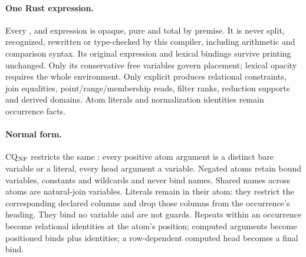 \paragraph{One Rust expression.}
Every ,  and  expression is opaque, pure and total
by premise. It is never split, recognized, rewritten or type-checked by this
compiler, including arithmetic and comparison syntax. Its original expression
and lexical bindings survive printing unchanged. Only its conservative free
variables govern placement; lexical opacity requires the whole environment.
Only explicit  produces relational constraints, join equalities,
point/range/membership reads, filter ranks, reduction supports and derived
domains. Atom literals and normalization identities remain occurrence facts.

\paragraph{Normal form.}
CQ$_{\rm NF}$ restricts the same : every positive atom argument is a
distinct bare variable or a literal, every head argument a variable. Negated
atoms retain bound variables, constants and wildcards and never bind names.
Shared names across atoms are natural-join variables. Literals remain in their atom: they
restrict the corresponding declared columns and drop those columns from the
occurrence's heading. They bind no variable and are not guards. Repeats within
an occurrence become relational identities at the atom's position; computed
arguments become positioned binds plus identities; a row-dependent computed head
becomes a final bind.


